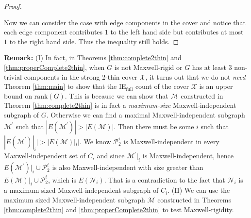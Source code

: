 \documentclass[10pt]{article}
\def\M{\mathcal {M}}
\def\N{\mathcal {N}}
\def\X{\mathcal {X}}
\def\P{\mathscr{P}}
\begin{document}
\begin{proof}
\begin{description}
\begin{comment}
Then we can divide edges of $G_i$ into $\P_1^i$, $\P_2^i$, $\P_3^i$, and $\P_4^i$. Following the proof of Theorem \ref{thm:complete2thin}, we can construct a subgraph $\M$ with $|E(\M)|$ $=$ IE$_{\text{full}}(\X)$. Using proper maximality and completeness of the cover, we can show that $\M$ is Maxwell-independent.

Moreover, we can obtain that for every $e\in \P_2^i$, every maximal Maxwell-independent subgraph $\N_i^\prime$ of $G_i$ contains $e$. 
Otherwise, we can consider the component $G_j$ whose $\N_j$ does not $e$ and from Lemma \ref{obs:maximal}(\ref{obs:maximal2}), we know $V(G_i)$ $\cup$ $V(G_j) =V(G)$, a contradiction.

The rest of the proof is the same as the proof of Theorem \ref{thm:complete2thin}.



\end{comment}
\end{description}


Now we can consider the case with edge components in the cover and notice that each edge component contributes $1$ to the left hand side but contributes at most $1$ to the right hand side. Thus the inequality still holds.
\end{proof}



\noindent
{\bf Remark:}
(I) In fact, in Theorems \ref{thm:complete2thin} and \ref{thm:properComplete2thin}, when $G$ is not Maxwell-rigid or $G$ has at least $3$ non-trivial components
in the strong 2-thin cover $\X$, it turns out that we do not {\em need}
Theorem \ref{thm:main} to show that the IE$_{\text{full}}$ count
of the cover $\X$ is an upper bound on $\text{rank}(G)$. This is because we can show that $\M$ constructed in Theorem
\ref{thm:complete2thin} is in fact a {\em maximum-size} Maxwell-independent subgraph
of $G$. Otherwise we can find a maximal Maxwell-independent subgraph
$\M^\prime$ such that $|E(\M^\prime)| > |E(\M)|$. Then there must be some $i$ such
that $|E(\M^\prime)|_i| >|E(\M)|_i|$. We know $\P_2^i$ is Maxwell-independent in
every Maxwell-independent set of $C_i$ and since $\M^\prime|_i$ is
Maxwell-independent, hence $E(\M^\prime)|_i\cup \P_2^i$ is also
Maxwell-independent with size greater than $E(\M)|_i\cup \P_2^i$, which is
$E(\N_i)$. That is a contradiction to the fact that $\N_i$ is a maximum sized
Maxwell-independent subgraph of $C_i$. (II) We can use the maximum sized Maxwell-independent subgraph $\M$ constructed in Theorems \ref{thm:complete2thin} and \ref{thm:properComplete2thin} to test Maxwell-rigidity.
\end{document}
